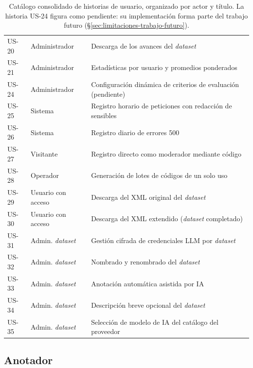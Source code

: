 \begin{table}[ht]
\begin{tabular}{llp{8.5cm}}
		US-20           & Administrador           & Descarga de los avances del \textit{dataset}                  \\
		US-21           & Administrador           & Estadísticas por usuario y promedios ponderados               \\
		US-24           & Administrador           & Configuración dinámica de criterios de evaluación (pendiente) \\
		US-25           & Sistema                 & Registro horario de peticiones con redacción de sensibles     \\
		US-26           & Sistema                 & Registro diario de errores 500                                \\
		US-27           & Visitante               & Registro directo como moderador mediante código               \\
		US-28           & Operador                & Generación de lotes de códigos de un solo uso                 \\
		US-29           & Usuario con acceso      & Descarga del XML original del \textit{dataset}                \\
		US-30           & Usuario con acceso      & Descarga del XML extendido (\textit{dataset} completado)      \\
		US-31           & Admin. \textit{dataset} & Gestión cifrada de credenciales LLM por \textit{dataset}      \\
		US-32           & Admin. \textit{dataset} & Nombrado y renombrado del \textit{dataset}                    \\
		US-33           & Admin. \textit{dataset} & Anotación automática asistida por IA                          \\
		US-34           & Admin. \textit{dataset} & Descripción breve opcional del \textit{dataset}               \\
		US-35           & Admin. \textit{dataset} & Selección de modelo de IA del catálogo del proveedor          \\
		\hline
	\end{tabular}
	\caption{Catálogo consolidado de historias de usuario, organizado por
		actor y título. La historia US-24 figura como pendiente: su implementación
		forma parte del trabajo futuro
		(\S\ref{sec:limitaciones-trabajo-futuro}).}
	\label{tab:us-catalogo}
\end{table}

\subsection{Anotador}

